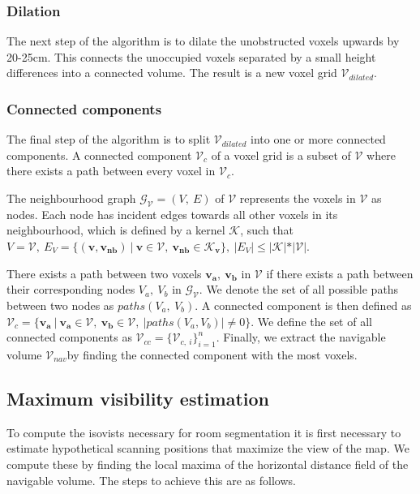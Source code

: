 \documentclass{article}
\begin{document}
\subsubsection{Dilation}
The next step of the algorithm is to dilate the unobstructed voxels upwards by 20-25cm. This connects the unoccupied voxels separated by a small height differences into a connected volume. The result is a new voxel grid \(\mathcal{V}_{dilated}\). 

\subsubsection{Connected components}
The final step of the algorithm is to split \(\mathcal{V}_{dilated}\) into one or more connected components. A connected component \(\mathcal{V}_c\) of a voxel grid is a subset of \(\mathcal{V}\) where there exists a path between every voxel in \(\mathcal{V}_c\). 

The neighbourhood graph \(\mathcal{G}_{\mathcal{V}} = (V,\ E)\) of \(\mathcal{V}\) represents the voxels in \(\mathcal{V}\) as nodes. Each node has incident edges towards all other voxels in its neighbourhood, which is defined by a kernel \(\mathcal{K}\), such that \(V = \mathcal{V},\ E_{V} = \{(\boldsymbol{v}, \boldsymbol{v_{nb}})\ |\ \boldsymbol{v} \in \mathcal{V},\ \boldsymbol{v_{nb}} \in \mathcal{K}_{\boldsymbol{v}}\},\ |E_{V}| \leq |\mathcal{K}|*|\mathcal{V}|\). 

There exists a path between two voxels \(\boldsymbol{v_a},\ \boldsymbol{v_b}\) in \(\mathcal{V}\) if there exists a path between their corresponding nodes \(V_a,\ V_b\) in \(\mathcal{G}_{\mathcal{V}}\). We denote the set of all possible paths between two nodes as \(paths(V_a,\ V_b)\). A connected component is then defined as \(\mathcal{V}_c=\{\boldsymbol{v_a}\ |\ \boldsymbol{v_a} \in \mathcal{V},\ \boldsymbol{v_b} \in \mathcal{V},\ |paths(V_a, V_b)| \neq 0\}\). We define the set of all connected components as \(\mathcal{V}_{cc}=\{\mathcal{V}_{c,\ i}\}_{i=1}^n\). Finally, we extract the navigable volume \(\mathcal{V}_{nav}\)by finding the connected component with the most voxels. 

\subsection{Maximum visibility estimation}
To compute the isovists necessary for room segmentation it is first necessary to estimate hypothetical scanning positions that maximize the view of the map. We compute these by finding the local maxima of the horizontal distance field of the navigable volume. The steps to achieve this are as follows. 
\end{document}
